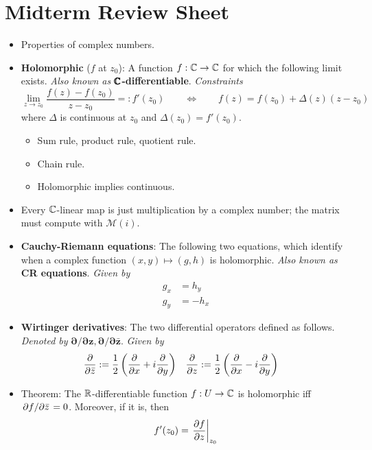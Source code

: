 \documentclass[../notes.tex]{subfiles}
\begin{document}
\section{Midterm Review Sheet}
\begin{itemize}
    \item {}Properties of complex numbers.
    \item \textbf{Holomorphic} ($f$ at $z_0$): A function $f:\mathbb{C}\to\mathbb{C}$ for which the following limit exists. \emph{Also known as} \textbf{$\pmb{\mathbb{C}}$-differentiable}. \emph{Constraints}
    \begin{equation*}
        \lim_{z\to z_0}\frac{f(z)-f(z_0)}{z-z_0} =: f'(z_0)
        \qquad\Longleftrightarrow\qquad
        f(z) = f(z_0)+\Delta(z)(z-z_0)
    \end{equation*}
    where $\Delta$ is continuous at $z_0$ and $\Delta(z_0)=f'(z_0)$.
    \begin{itemize}
        \item Sum rule, product rule, quotient rule.
        \item Chain rule.
        \item Holomorphic implies continuous.
    \end{itemize}
    \item Every $\mathbb{C}$-linear map is just multiplication by a complex number; the matrix must compute with $\mathcal{M}(i)$.
    \item \textbf{Cauchy-Riemann equations}: The following two equations, which identify when a complex function $(x,y)\mapsto(g,h)$ is holomorphic. \emph{Also known as} \textbf{CR equations}. \emph{Given by}
    \begin{align*}
        g_x &= h_y\\
        g_y &= -h_x
    \end{align*}
    \item \textbf{Wirtinger derivatives}: The two differential operators defined as follows. \emph{Denoted by} $\bm{\partial/\partial z,\partial/\partial\bar{z}}$. \emph{Given by}
    \begin{align*}
        \pdv{\bar{z}} &:= \frac{1}{2}\left( \pdv{x}+i\pdv{y} \right)&
        \pdv{z} &:= \frac{1}{2}\left( \pdv{x}-i\pdv{y} \right)
    \end{align*}
    \item Theorem: The $\mathbb{R}$-differentiable function $f:U\to\mathbb{C}$ is holomorphic iff $\pdv*{f}{\bar{z}}=0$. Moreover, if it is, then
    \begin{equation*}
        f'(z_0) = \eval{\pdv{f}{z}}_{z_0}

\end{equation*}
\end{itemize}
\end{document}
